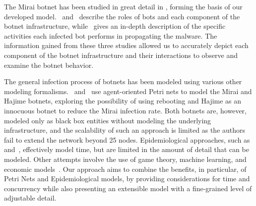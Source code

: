 The Mirai botnet has been studied in great detail in \cite{kolias2017_Mirai_DDoS, kambourakis2017mirai, Antonakakis2017_USENIX_Mirai_First_Study}, forming the basis of our developed model.~\cite{kolias2017_Mirai_DDoS} and~\cite{Antonakakis2017_USENIX_Mirai_First_Study} describe the roles of bots and each component of the botnet infrastructure, while~\cite{kambourakis2017mirai} gives an in-depth description of the specific activities each infected bot performs in propagating the malware. The information gained from these three studies allowed us to accurately depict each component of the botnet infrastructure and their interactions to observe and examine the botnet behavior.

The general infection process of botnets has been modeled using various other modeling formalisms.~\cite{tanaka2017modeling} and~\cite{tanaka2019_PN_Botnet} use agent-oriented Petri nets to model the Mirai and Hajime botnets, exploring the possibility of using rebooting and Hajime as an innocuous botnet to reduce the Mirai infection rate. Both botnets are, however, modeled only as black box entities without modeling the underlying infrastructure, and the scalability of such an approach is limited as the authors fail to extend the network beyond 25 nodes. Epidemiological approaches, such as~\cite{kephart1993epidemiological} and~\cite{jerkins2018epidemiological}, effectively model time, but are limited in the amount of detail that can be modeled. Other attempts involve the use of game theory, machine learning, and economic models~\cite{wainwright2019_Botnet_Models}. Our approach aims to combine the benefits, in particular, of Petri Nets and Epidemiological models, by providing considerations for time and concurrency while also presenting an extensible model with a fine-grained level of adjustable detail.
\par

